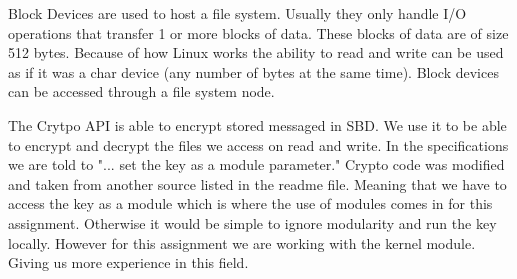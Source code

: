 \documentclass[onecolumn, draftclsnofoot,10pt, compsoc]{IEEEtran}
\begin{document}
Block Devices are used to host a file system. Usually they only handle I/O operations that transfer 1 or more blocks of data. These blocks of data are of size 512 bytes. Because of how Linux works the ability to read and write can be used as if it was a char device (any number of bytes at the same time). Block devices can be accessed through a file system node.

The Crytpo API is able to encrypt stored messaged in SBD. We use it to be able to encrypt and decrypt the files we access on read and write. In the specifications we are told to "... set the key as a module parameter." Crypto code was modified and taken from another source listed in the readme file. Meaning that we have to access the key as a module which is where the use of modules comes in for this assignment. Otherwise it would be simple to ignore modularity and run the key locally. However for this assignment we are working with the kernel module. Giving us more experience in this field.
\end{document}
